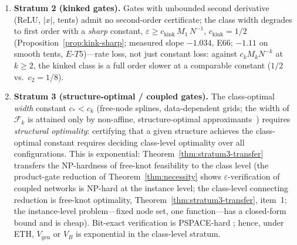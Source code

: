 \begin{theorem}
\begin{enumerate}
    \item \textbf{Stratum 2 (kinked gates).} Gates with unbounded second
    derivative (ReLU, $|x|$, tents) admit no second-order certificate;
    the class width degrades to first order with a \emph{sharp}
    constant, $\varepsilon \geq c_{\mathrm{kink}}\, M_1\, N^{-1}$,
    $c_{\mathrm{kink}} = 1/2$
    (Proposition~\ref{prop:kink-sharp}; measured slope $-1.034$, E66;
    $-1.11$ on smooth tents, $E$-$T5$)---rate loss, not just constant
    loss: against $c_k M_k N^{-k}$ at $k \geq 2$, the kinked class is a
    full order slower at a comparable constant
    ($1/2$ vs.\ $c_2 = 1/8$).

    \item \textbf{Stratum 3 (structure-optimal / coupled gates).} The
    class-optimal \emph{width} constant $c_* < c_k$ (free-node splines,
    data-dependent grids; the width of $\mathcal{F}_k$ is attained only
    by non-affine, structure-optimal approximants~\cite{pinkus1985width})
    requires \emph{structural optimality}: certifying that a given
    structure achieves the class-optimal constant requires deciding
    class-level optimality over all configurations. This is
    exponential: Theorem~\ref{thm:stratum3-transfer} transfers the
    NP-hardness of free-knot feasibility to the class level (the
    product-gate reduction of Theorem~\ref{thm:necessity} shows
    $\varepsilon$-verification of coupled networks is NP-hard at the
    instance level; the class-level connecting reduction is free-knot
    optimality, Theorem~\ref{thm:stratum3-transfer}, item~1; the
    instance-level problem---fixed node set, one function---has a
    closed-form bound and is cheap). Bit-exact verification is
    PSPACE-hard \cite{hlz2021quantized}; hence, under ETH,
    $V_{\text{gen}}$ or $V_B$ is exponential in the class-level
    stratum.


\end{enumerate}
\end{theorem}
